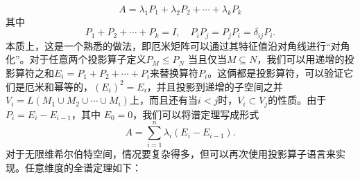 \[
A=\lambda_{1} P_{1}+\lambda_{2} P_{2}+\cdots+\lambda_{k} P_{k}
\]
其中
\[
P_{1}+P_{2}+\cdots+P_{k}=I, \quad P_{i} P_{j}=P_{j} P_{i}=\delta_{i j} P_{i} .
\]
本质上，这是一个熟悉的做法，即厄米矩阵可以通过其特征值沿对角线进行“对角化”。对于任意两个投影算子定义\(P_{M} \leq P_{N}\) 当且仅当\(M \subseteq N\)，我们可以用递增的投影算符之和\(E_{i}=P_{1}+P_{2}+\cdots+P_{i}\)来替换算符\(P_{i}\)。这俩都是投影算符，可以验证它们是厄米和幂等的，\(\left(E_{i}\right)^{2}=E_{i}\)，并且投影到递增的子空间之并 \(V_{i }=L\left(M_{1} \cup M_{2} \cup \cdots \cup M_{i}\right)\)上，而且还有当\(i<j\)时，\(V_{i} \subset V_{j}\)的性质。由于\(P_{i}=E_{i}-E_{i-1}\)，其中 \(E_{0}=0\)，我们可以将谱定理写成形式
\[
A=\sum_{i=1}^{n} \lambda_{i}\left(E_{i}-E_{i-1}\right) .
\]
对于无限维希尔伯特空间，情况要复杂得多，但可以再次使用投影算子语言来实现。任意维度的全谱定理如下：

